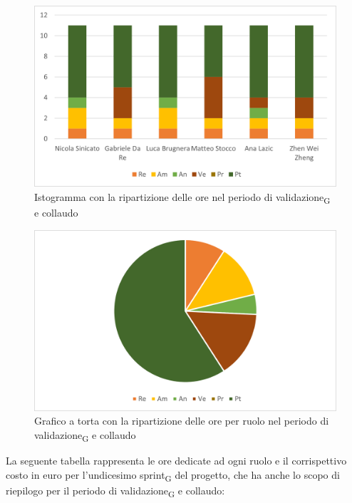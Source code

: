 \begin{figure}[H]
	\centering
	\includegraphics[scale=0.6]{img/grafi preventivo/istogrammi/architetturale/complessivo.png}
	\caption{Istogramma con la ripartizione delle ore nel periodo di validazione\textsubscript{G} e collaudo}
\end{figure}
\begin{figure}[H]
	\centering
	\includegraphics[scale=0.6]{img/grafi preventivo/torta/architetturale/complessivo.png}
	\caption{Grafico a torta con la ripartizione delle ore per ruolo nel periodo di validazione\textsubscript{G} e collaudo}
\end{figure}
La seguente tabella rappresenta le ore dedicate ad ogni ruolo e il corrispettivo costo in euro per l'undicesimo sprint\textsubscript{G} del progetto, che ha anche lo scopo di riepilogo per il periodo di validazione\textsubscript{G} e collaudo:

